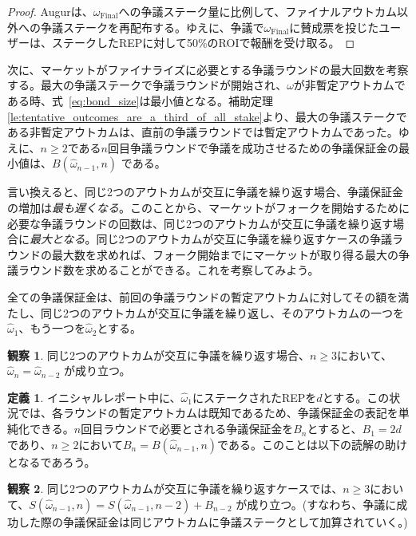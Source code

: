 \documentclass[floatfix,reprint,nofootinbib,amsmath,amssymb,epsfig,pre,floats,letterpaper,groupedaffiliation]{revtex4-1}
\theoremstyle{definition}
\newtheorem{observation}{観察}
\theoremstyle{definition}
\newtheorem{definition}{定義}
\theoremstyle{definition}
\begin{document}
\begin{appendix}
\begin{proof}
Augurは、$\omega_{\mathrm{Final}}$への争議ステーク量に比例して、ファイナルアウトカム以外への争議ステークを再配布する。ゆえに、争議で$\omega_{\mathrm{Final}}$に賛成票を投じたユーザーは、ステークしたREPに対して50\%のROIで報酬を受け取る。
\end{proof}

次に、マーケットがファイナライズに必要とする争議ラウンドの最大回数を考察する。最大の争議ステークで争議ラウンドが開始され、$\omega$が非暫定アウトカムである時、式~\ref{eq:bond_size}は最小値となる。補助定理\ref{le:tentative_outcomes_are_a_third_of_all_stake}より、最大の争議ステークである非暫定アウトカムは、直前の争議ラウンドでは暫定アウトカムであった。ゆえに、$n \geq 2$である$n$回目争議ラウンドで争議を成功させるための争議保証金の最小値は、$B(\hat{\omega}_{n-1},n)$ である。

言い換えると、同じ2つのアウトカムが交互に争議を繰り返す場合、争議保証金の増加は\emph{最も遅くなる}。このことから、マーケットがフォークを開始するために必要な争議ラウンドの回数は、同じ2つのアウトカムが交互に争議を繰り返す場合に\emph{最大となる}。同じ2つのアウトカムが交互に争議を繰り返すケースの争議ラウンドの最大数を求めれば、フォーク開始までにマーケットが取り得る最大の争議ラウンド数を求めることができる。これを考察してみよう。

全ての争議保証金は、前回の争議ラウンドの暫定アウトカムに対してその額を満たし、同じ2つのアウトカムが交互に争議を繰り返し、そのアウトカムの一つを$\hat{\omega}_{1}$、もう一つを$\hat{\omega}_{2}$とする。

\begin{observation}\label{ob:tentative_outcomes_repeat}
同じ2つのアウトカムが交互に争議を繰り返す場合、$n \geq 3$において、$\hat{\omega}_{n} = \hat{\omega}_{n-2}$ が成り立つ。
\end{observation}

\begin{definition}
イニシャルレポート中に、$\hat{\omega}_{1}$にステークされたREPを$d$とする。この状況では、各ラウンドの暫定アウトカムは既知であるため、争議保証金の表記を単純化できる。$n$回目ラウンドで必要とされる争議保証金を$B_n$とすると、$B_{1} = 2d$であり、$n \geq 2$において$B_{n} = B(\hat{\omega}_{n-1},n)$である。このことは以下の読解の助けとなるであろう。
\end{definition}

\begin{observation}\label{ob:every_other_dispute_stake_applies_to_same_outcome}
同じ2つのアウトカムが交互に争議を繰り返すケースでは、$n \geq 3$において、$S(\hat{\omega}_{n-1},n) = S(\hat{\omega}_{n-1},n-2) + B_{n-2}$ が成り立つ。(すなわち、争議に成功した際の争議保証金は同じアウトカムに争議ステークとして加算されていく。)
\end{observation}


\end{appendix}
\end{document}
